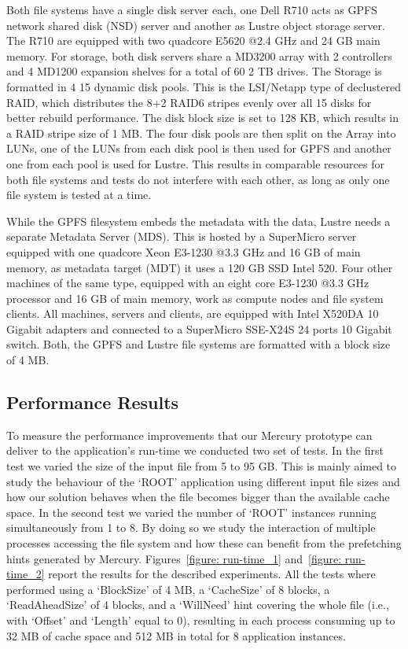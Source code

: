Both file systems have a single disk server each, one Dell R710 acts as GPFS network shared disk (NSD) server and another as Lustre object storage server. The R710 are equipped 
with two quadcore E5620 @2.4 GHz and 24 GB main memory. For storage, both disk servers share a MD3200 array with 2 controllers and 4 MD1200 expansion shelves for a total 
of 60 2 TB drives. The Storage is formatted in 4 15 dynamic disk pools. This is the LSI/Netapp type of declustered RAID, which distributes the 8+2 RAID6 stripes evenly 
over all 15 disks for better rebuild performance. The disk block size is set to 128 KB, which results in a RAID stripe size of 1 MB. The four disk pools are then split 
on the Array into LUNs, one of the LUNs from each disk pool is then used for GPFS and another one from each pool is used for Lustre. This results in comparable resources 
for both file systems and tests do not interfere with each other, as long as only one file system is tested at a time. 

While the GPFS filesystem embeds the metadata with the data, Lustre needs a separate Metadata Server (MDS). This is hosted by a SuperMicro server equipped with one quadcore Xeon 
E3-1230 @3.3 GHz and 16 GB of main memory, as metadata target (MDT) it uses a 120 GB SSD Intel 520. Four other machines of the same type, equipped with an eight core E3-1230 @3.3 
GHz processor and 16 GB of main memory, work as compute nodes and file system clients. All machines, servers and clients, are equipped with Intel X520DA 10 Gigabit adapters and 
connected to a SuperMicro SSE-X24S 24 ports 10 Gigabit switch. Both, the GPFS and Lustre file systems are formatted with a block size of 4 MB.

\subsection{Performance Results}
To measure the performance improvements that our Mercury prototype can deliver to the application's run-time we conducted two set of tests. In the first test we varied the size of the input file from 5 to 95 GB. 
This is mainly aimed to study the behaviour of the `ROOT' application using different input file sizes and how our solution behaves when the file becomes bigger than the available cache space. In the second 
test we varied the number of `ROOT' instances running simultaneously from 1 to 8. By doing so we study the interaction of multiple processes accessing the file system and how these can benefit from the prefetching 
hints generated by Mercury. Figures~\ref{figure: run-time_1} and~\ref{figure: run-time_2} report the results for the described experiments. All the tests where performed using a `BlockSize' of 4 MB, a `CacheSize' of 
8 blocks, a `ReadAheadSize' of 4 blocks, and a `WillNeed' hint covering the whole file (i.e., with `Offset' and `Length' equal to 0), resulting in each process consuming up to 32 MB of cache space and 512 MB in total 
for 8 application instances. 

